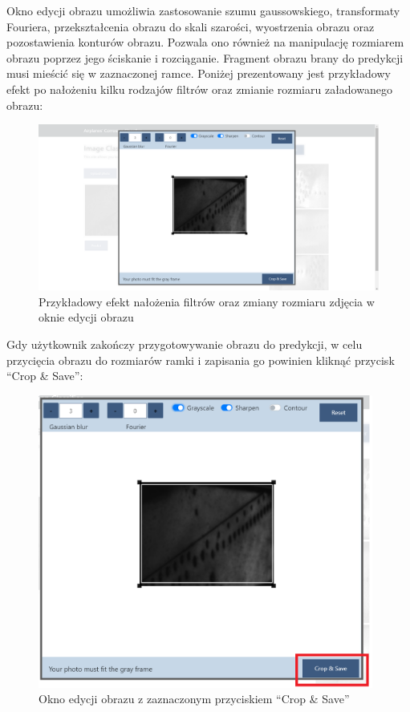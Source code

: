 \documentclass[polish,12pt]{aghthesis}
\begin{document}
\noindent Okno edycji obrazu umożliwia zastosowanie szumu gaussowskiego, transformaty Fouriera, przekształcenia obrazu do skali szarości, wyostrzenia obrazu oraz pozostawienia konturów obrazu. Pozwala ono również na manipulację rozmiarem obrazu poprzez jego ściskanie i rozciąganie. Fragment obrazu brany do predykcji musi mieścić się w zaznaczonej ramce.
\newline Poniżej prezentowany jest przykładowy efekt po nałożeniu kilku rodzajów filtrów oraz zmianie rozmiaru załadowanego obrazu:
\begin{figure}[H]%
\centering
\includegraphics[width=14.5cm]{images/przykladoweFiltry.PNG}
\caption{Przykładowy efekt nałożenia filtrów oraz zmiany rozmiaru zdjęcia w oknie edycji obrazu}
\end{figure}

\noindent Gdy użytkownik zakończy przygotowywanie obrazu do predykcji, w celu przycięcia obrazu do rozmiarów ramki i zapisania go powinien kliknąć przycisk ``Crop \& Save'':
\begin{figure}[H]%
\centering
\includegraphics[width=11cm]{images/cropAndSave.PNG}
\caption{Okno edycji obrazu z zaznaczonym przyciskiem ``Crop \& Save''}
\end{figure}
\end{document}
